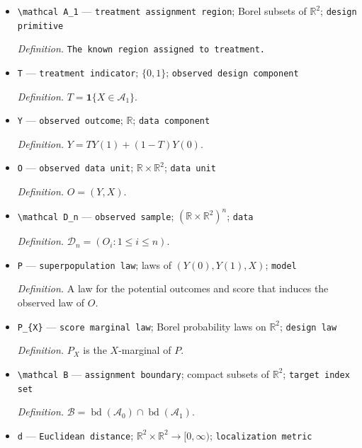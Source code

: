 \documentclass{article}
\begin{document}
\begin{itemize}
  \par\smallskip\noindent\emph{Definition.} \texttt{The known region assigned to control.}
  \item \texttt{\textbackslash{}\allowbreak{}mathcal A\_\allowbreak{}1} --- \texttt{treatment assignment region}; Borel subsets of \(\mathbb R^2\); \texttt{design primitive}
  \par\smallskip\noindent\emph{Definition.} \texttt{The known region assigned to treatment.}
  \item \texttt{T} --- \texttt{treatment indicator}; \(\{0,1\}\); \texttt{observed design component}
  \par\smallskip\noindent\emph{Definition.} \(T=\mathbf 1\{X\in\mathcal A_1\}\).
  \item \texttt{Y} --- \texttt{observed outcome}; \(\mathbb R\); \texttt{data component}
  \par\smallskip\noindent\emph{Definition.} \(Y=T Y(1)+(1-T)Y(0)\).
  \item \texttt{O} --- \texttt{observed data unit}; \(\mathbb R\times\mathbb R^2\); \texttt{data unit}
  \par\smallskip\noindent\emph{Definition.} \(O=(Y,X)\).
  \item \texttt{\textbackslash{}\allowbreak{}mathcal D\_\allowbreak{}n} --- \texttt{observed sample}; \((\mathbb R\times\mathbb R^2)^n\); \texttt{data}
  \par\smallskip\noindent\emph{Definition.} \(\mathcal D_n=(O_i:1\le i\le n)\).
  \item \texttt{P} --- \texttt{superpopulation law}; laws of \((Y(0),Y(1),X)\); \texttt{model}
  \par\smallskip\noindent\emph{Definition.} A law for the potential outcomes and score that induces the observed law of \(O\).
  \item \texttt{P\_\allowbreak{}\{X\}\allowbreak{}} --- \texttt{score marginal law}; Borel probability laws on \(\mathbb R^2\); \texttt{design law}
  \par\smallskip\noindent\emph{Definition.} \(P_X\) is the \(X\)-marginal of \(P\).
  \item \texttt{\textbackslash{}\allowbreak{}mathcal B} --- \texttt{assignment boundary}; compact subsets of \(\mathbb R^2\); \texttt{target index set}
  \par\smallskip\noindent\emph{Definition.} \(\mathcal B=\operatorname{bd}(\mathcal A_0)\cap\operatorname{bd}(\mathcal A_1)\).
  \item \texttt{d} --- \texttt{Euclidean distance}; \(\mathbb R^2\times\mathbb R^2\to[0,\infty)\); \texttt{localization metric}

\end{itemize}
\end{document}
